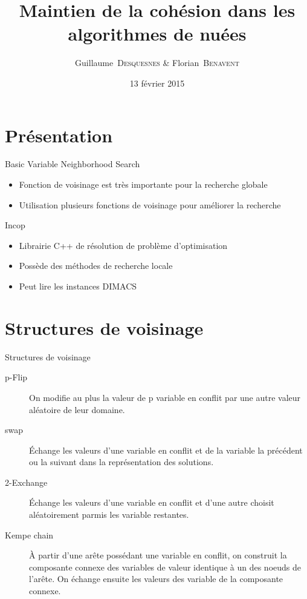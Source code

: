 \documentclass{beamer}
\title[Métaheuristique : Algorithme BVNS]
{%
	Maintien de la cohésion dans les algorithmes de nuées
}
\author{Guillaume~\textsc{Desquesnes} \& Florian~\textsc{Benavent}}
\date{13 février 2015}
\begin{document}
	\frame{\titlepage}

	\section{Présentation}

		\begin{frame}{Basic Variable Neighborhood Search}
			\begin{itemize}
				\item Fonction de voisinage est très importante pour la recherche globale
				\item Utilisation plusieurs fonctions de voisinage pour améliorer la recherche
			\end{itemize}
		\end{frame}
		
		
		\begin{frame}{Incop}
			\begin{itemize}
				\item Librairie C++ de résolution de problème d'optimisation
				\item Possède des méthodes de recherche locale
				\item Peut lire les instances DIMACS
			\end{itemize}
		\end{frame}
	
	\section{Structures de voisinage}
		\begin{frame}{Structures de voisinage}
			\begin{description}
				\item[p-Flip]On modifie au plus la valeur de p variable en conflit par une autre valeur aléatoire de leur domaine.

				\item[swap]\'Echange les valeurs d'une variable en conflit et de la variable la précédent ou la suivant dans la représentation des solutions.

				\item[2-Exchange]\'Echange les valeurs d'une variable en conflit et d'une autre choisit aléatoirement parmis les variable restantes.

				\item[Kempe chain]À partir d'une arête possédant une variable en conflit, on construit la composante connexe des variables de valeur identique à un des
				noeuds de l'arête. On échange ensuite les valeurs des variable de la composante connexe.
			\end{description}
		\end{frame}
	
\end{document}

